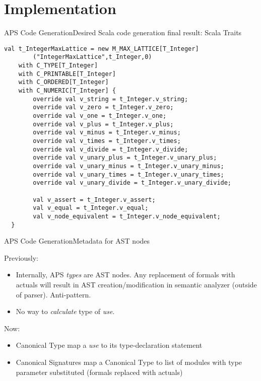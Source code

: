\section{Implementation}


\begin{frame}[fragile=singleslide]{APS Code Generation}{Desired Scala code generation final result: Scala Traits}


\begin{Verbatim}[fontsize=\tiny]
val t_IntegerMaxLattice = new M_MAX_LATTICE[T_Integer]
        ("IntegerMaxLattice",t_Integer,0)
    with C_TYPE[T_Integer]
    with C_PRINTABLE[T_Integer]
    with C_ORDERED[T_Integer]
    with C_NUMERIC[T_Integer] {
        override val v_string = t_Integer.v_string;
        override val v_zero = t_Integer.v_zero;
        override val v_one = t_Integer.v_one;
        override val v_plus = t_Integer.v_plus;
        override val v_minus = t_Integer.v_minus;
        override val v_times = t_Integer.v_times;
        override val v_divide = t_Integer.v_divide;
        override val v_unary_plus = t_Integer.v_unary_plus;
        override val v_unary_minus = t_Integer.v_unary_minus;
        override val v_unary_times = t_Integer.v_unary_times;
        override val v_unary_divide = t_Integer.v_unary_divide;
        
        val v_assert = t_Integer.v_assert;
        val v_equal = t_Integer.v_equal;
        val v_node_equivalent = t_Integer.v_node_equivalent;
  }
\end{Verbatim}

\end{frame}

\begin{frame}[fragile=singleslide]{APS Code Generation}{Metadata for AST nodes}

Previously:

\begin{itemize}
    \item Internally, APS \emph{types} are AST nodes. Any replacement of formals with actuals will result in AST creation/modification in semantic analyzer (outside of parser). \alert{Anti-pattern}.
    \item No way to \emph{calculate} type of \emph{use}.
\end{itemize}

Now:

\begin{itemize}
    \item \alert{Canonical Type} map a \emph{use} to its type-declaration statement
    \item \alert{Canonical Signatures} map a \alert{Canonical Type} to list of modules with type parameter \alert{substituted} (formals replaced with actuals)
\end{itemize}

\end{frame}


